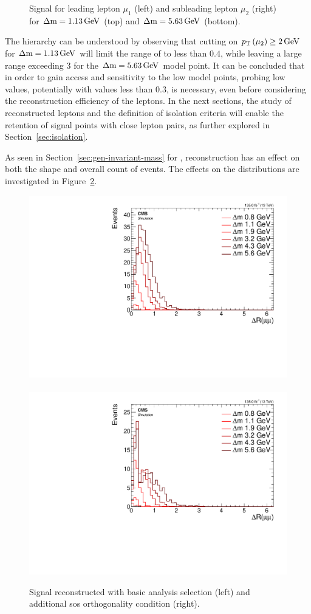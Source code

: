 \begin{figure}[!htb]
\caption[Signal \drmm \vs \pt]{ Signal \drmm \vs \pt for leading lepton $\mu_1$ (left) and subleading lepton $\mu_2$ (right) for $\Delta\mathrm{m}=1.13\,\text{Ge\hspace{-.08em}V}$ (top) and $\Delta\mathrm{m}=5.63\,\text{Ge\hspace{-.08em}V}$ (bottom).}
\label{fig:signal-gen-dr-pt}
\end{figure}

The hierarchy can be understood by observing that cutting on $p_{\mathrm{T}}\left(\mu_2\right)\geq 2\,\text{Ge\hspace{-.08em}V}$ for $\Delta\mathrm{m}=1.13\,\text{Ge\hspace{-.08em}V}$ will limit the range of \drmm to less than $0.4$, while leaving a large range exceeding 3 for the $\Delta\mathrm{m}=5.63\,\text{Ge\hspace{-.08em}V}$ model point. It can be concluded that in order to gain access and sensitivity to the low \dm model points, probing low \drll values, potentially with values less than 0.3, is necessary, even before considering the reconstruction efficiency of the leptons. In the next sections, the study of reconstructed leptons and the definition of isolation criteria will enable the retention of signal points with close lepton pairs, as further explored in Section~\ref{sec:isolation}.

As seen in Section~\ref{sec:gen-invariant-mass} for \mmumu, reconstruction has an effect on both the shape and overall count of events. The effects on the \drmm distributions are investigated in Figure~\ref{fig:reco-signal-dr}.

\begin{figure}[!htb]
\centering
\includegraphics[width=0.48\linewidth]{plots/signal_muons/none_deltaRCorrJetNoMultIso10Dr0.6.pdf} \,
\includegraphics[width=0.48\linewidth]{plots/signal_muons/none_deltaRCorrJetNoMultIso10Dr0.6_orth.pdf}  \\
\caption[Signal reconstructed \drmm]{ Signal reconstructed \drmm with basic analysis selection (left) and additional \gls{sos} orthogonality condition (right).}
\label{fig:reco-signal-dr}
\end{figure}

